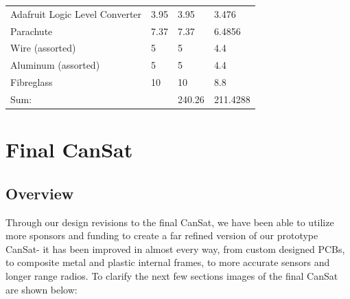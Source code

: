 \documentclass[]{report}
\begin{document}
\begin{center}
\begin{longtable}{llll}
				Adafruit Logic Level Converter & 3.95             & 3.95              & 3.476       \\
				Parachute                      & 7.37             & 7.37              & 6.4856      \\
				Wire (assorted)                & 5                & 5                 & 4.4         \\
				Aluminum (assorted)            & 5                & 5                 & 4.4         \\
				Fibreglass                     & 10               & 10                & 8.8         \\ \hline
				Sum:                           &                  & 240.26            & 211.4288   
		\end{longtable}
	\end{center}
			 
		 
	\section{Final CanSat}
		\label{sect:final}
		
		\subsection{Overview}
		Through our design revisions to the final CanSat, we have been able to utilize more sponsors and funding to create a far refined version of our prototype CanSat- it has been improved in almost every way, from custom designed PCBs, to composite metal and plastic internal frames, to more accurate sensors and longer range radios. To clarify the next few sections images of the final CanSat are shown below:
		
\end{document}
